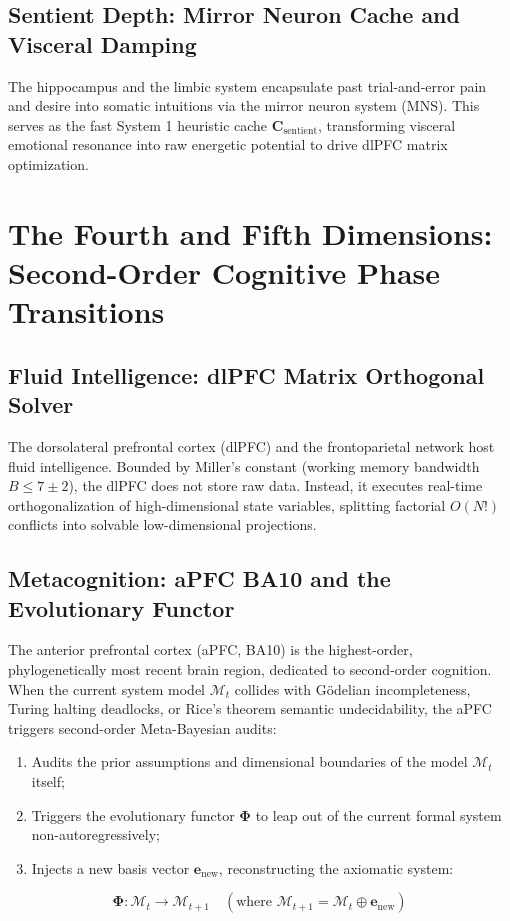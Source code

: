 \documentclass[11pt,a4paper]{article}
\begin{document}
\subsection{Sentient Depth: Mirror Neuron Cache and Visceral Damping}
The hippocampus and the limbic system encapsulate past trial-and-error pain and desire into somatic intuitions via the mirror neuron system (MNS). This serves as the fast System 1 heuristic cache $\mathbf{C}_{\text{sentient}}$, transforming visceral emotional resonance into raw energetic potential to drive dlPFC matrix optimization.

\section{The Fourth and Fifth Dimensions: Second-Order Cognitive Phase Transitions}

\subsection{Fluid Intelligence: dlPFC Matrix Orthogonal Solver}
The dorsolateral prefrontal cortex (dlPFC) and the frontoparietal network host fluid intelligence. Bounded by Miller's constant (working memory bandwidth $B \le 7 \pm 2$), the dlPFC does not store raw data. Instead, it executes real-time orthogonalization of high-dimensional state variables, splitting factorial $O(N!)$ conflicts into solvable low-dimensional projections.

\subsection{Metacognition: aPFC BA10 and the Evolutionary Functor}
The anterior prefrontal cortex (aPFC, BA10) is the highest-order, phylogenetically most recent brain region, dedicated to second-order cognition. When the current system model $\mathcal{M}_t$ collides with G\"odelian incompleteness, Turing halting deadlocks, or Rice's theorem semantic undecidability, the aPFC triggers second-order Meta-Bayesian audits:
\begin{enumerate}
    \item Audits the prior assumptions and dimensional boundaries of the model $\mathcal{M}_t$ itself;
    \item Triggers the evolutionary functor $\mathbf{\Phi}$ to leap out of the current formal system non-autoregressively;
    \item Injects a new basis vector $\mathbf{e}_{\text{new}}$, reconstructing the axiomatic system:
\end{enumerate}
\begin{equation}
\mathbf{\Phi} : \mathcal{M}_t \to \mathcal{M}_{t+1} \quad (\text{where } \mathcal{M}_{t+1} = \mathcal{M}_t \oplus \mathbf{e}_{\text{new}})
\end{equation}
\end{document}

